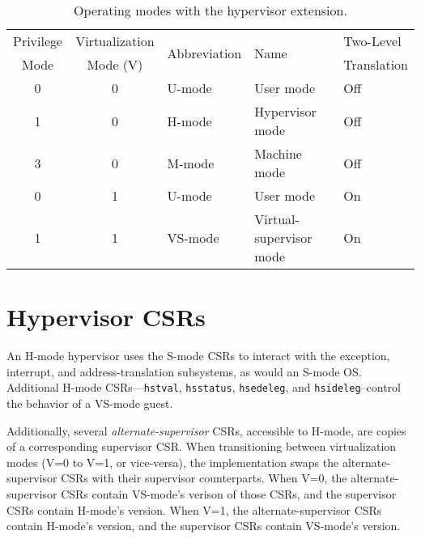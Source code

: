 \begin{table*}[h!]
\begin{center}
\begin{tabular}{|c|c||l|l|l|}
  \hline
   Privilege & Virtualization & \multirow{2}{*}{Abbreviation} & \multirow{2}{*}{Name} & Two-Level \\
   Mode      & Mode (V)       &                               &                       & Translation \\ \hline
   0         & 0              & U-mode  & User mode & Off \\
   1         & 0              & H-mode  & Hypervisor mode & Off \\
   3         & 0              & M-mode  & Machine mode & Off \\
   0         & 1              & U-mode  & User mode & On \\
   1         & 1              & VS-mode & Virtual-supervisor mode & On \\
  \hline
 \end{tabular}
\end{center}
\caption{Operating modes with the hypervisor extension.}
\label{h-operating-modes}
\end{table*}

\section{Hypervisor CSRs}

An H-mode hypervisor uses the S-mode CSRs to interact with the exception,
interrupt, and address-translation subsystems, as would an S-mode OS.
Additional H-mode CSRs---{\tt hstval}, {\tt hsstatus}, {\tt hsedeleg}, and
{\tt hsideleg}--control the behavior of a VS-mode guest.

Additionally, several {\em alternate-supervisor} CSRs, accessible to H-mode,
are copies of a corresponding supervisor CSR.  When transitioning between
virtualization modes (V=0 to V=1, or vice-versa), the implementation swaps the
alternate-supervisor CSRs with their supervisor counterparts.  When V=0, the
alternate-supervisor CSRs contain VS-mode's verison of those CSRs, and the
supervisor CSRs contain H-mode's version.  When V=1, the alternate-supervisor
CSRs contain H-mode's version, and the supervisor CSRs contain VS-mode's
version.




%
%
%
%
